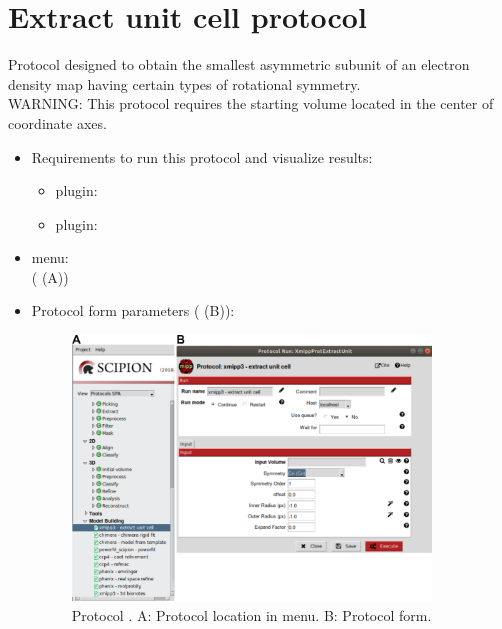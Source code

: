 \section{Extract unit cell protocol}
\label{app:extractUnitCell}%
Protocol designed to obtain the smallest asymmetric subunit of an electron density map having certain types of rotational symmetry.\\
WARNING: This protocol requires the starting volume located in the center of coordinate axes.

\begin{itemize}
  \item Requirements to run this protocol and visualize results:
    \begin{itemize}
        \item \scipion plugin: 
        \item \scipion plugin: 
    \end{itemize}
  \item \scipion menu:\\
   ( (A))
  
  \item Protocol form parameters ( (B)):
  
  \begin{figure}[H]
    \centering 
    \captionsetup{width=.7\linewidth} 
    \includegraphics[width=0.90\textwidth]{Images_appendix/Fig107.pdf}
    \caption{Protocol . A: Protocol location in \scipion menu. B: Protocol form.}
    \label{fig:app_protocol_extractUnitCell_1}
   \end{figure}
  

\end{itemize}
